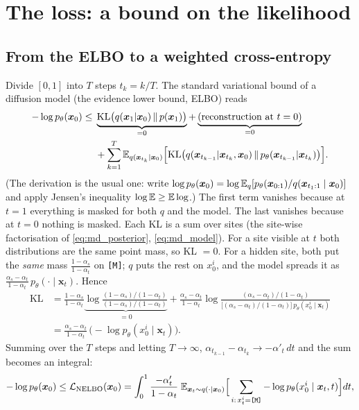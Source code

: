 \section{The loss: a bound on the likelihood}\label{sec:md_elbo}
\subsection{From the ELBO to a weighted cross-entropy}
Divide $[0,1]$ into $T$ steps $t_k=k/T$. The standard variational bound of a diffusion model (the evidence lower
bound, ELBO) reads
\begin{align*}
-\log p_\theta(\bm x_0)\le{}&\underbrace{\mathrm{KL}\big(q(\bm x_1|\bm x_0)\,\|\,p(\bm x_1)\big)}_{=0}
+\underbrace{(\text{reconstruction at }t=0)}_{=0}\\
&+\sum_{k=1}^{T}\mathbb{E}_{q(\bm x_{t_k}|\bm x_0)}\Big[\mathrm{KL}\big(q(\bm x_{t_{k-1}}|\bm x_{t_k},\bm x_0)\,\|\,p_\theta(\bm x_{t_{k-1}}|\bm x_{t_k})\big)\Big].
\end{align*}
(The derivation is the usual one: write $\log p_\theta(\bm x_0)=\log\mathbb{E}_q[p_\theta(\bm x_{0:1})/q(\bm x_{t_1:1}\mid\bm x_0)]$ and
apply Jensen's inequality $\log\mathbb{E}\ge\mathbb{E}\log$.) The first term vanishes because at $t=1$ everything is masked for
both $q$ and the model. The last vanishes because at $t=0$ nothing is masked. Each KL is a sum over sites (the
site-wise factorisation of \eqref{eq:md_posterior}, \eqref{eq:md_model}). For a site visible at $t$ both
distributions are the same point mass, so KL $=0$. For a hidden site, both put the \emph{same} mass
$\frac{1-\alpha_s}{1-\alpha_t}$ on \texttt{[M]}; $q$ puts the rest on $x^i_0$, and the model spreads it as
$\frac{\alpha_s-\alpha_t}{1-\alpha_t}\,p_\theta(\cdot\mid\bm x_t)$. Hence
\begin{align*}
\mathrm{KL}&=\frac{1-\alpha_s}{1-\alpha_t}\underbrace{\log\frac{(1-\alpha_s)/(1-\alpha_t)}{(1-\alpha_s)/(1-\alpha_t)}}_{=0}
+\frac{\alpha_s-\alpha_t}{1-\alpha_t}\log\frac{(\alpha_s-\alpha_t)/(1-\alpha_t)}{\big[(\alpha_s-\alpha_t)/(1-\alpha_t)\big]\,p_\theta(x^i_0\mid\bm x_t)}\\
&=\frac{\alpha_s-\alpha_t}{1-\alpha_t}\,\big(-\log p_\theta(x^i_0\mid\bm x_t)\big).
\end{align*}
Summing over the $T$ steps and letting $T\to\infty$, $\alpha_{t_{k-1}}-\alpha_{t_k}\to-\alpha'_t\,dt$ and the sum becomes an
integral:
\begin{equation}\label{eq:md_nelbo}
-\log p_\theta(\bm x_0)\le\mathcal L_{\text{NELBO}}(\bm x_0)=\int_0^1\frac{-\alpha'_t}{1-\alpha_t}\;
\mathbb{E}_{\bm x_t\sim q(\cdot|\bm x_0)}\Big[\sum_{i:\,x^i_t=\texttt{[M]}}-\log p_\theta(x^i_0\mid\bm x_t,t)\Big]dt ,
\end{equation}
